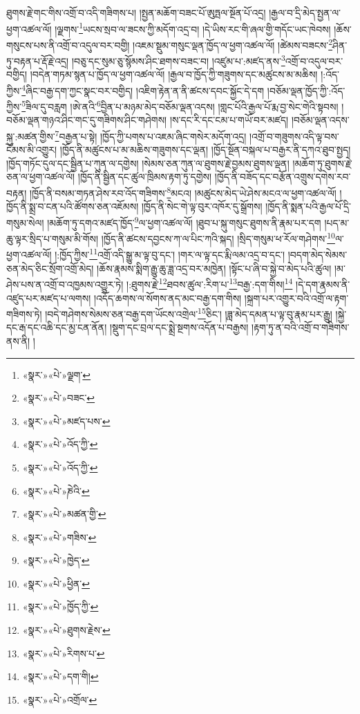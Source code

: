 ཐུགས་རྗེ་གང་གིས་འགྲོ་བ་འདི་གཟིགས་པ། །སྤྱན་མཆོག་བཟང་པོ་ཨུཏྤལ་སྔོན་པོ་འདྲ། །རྒྱལ་བ་དྲི་མེད་སྤྱན་ལ་ཕྱག་འཚལ་ལོ། །ལྗགས་\footnote{«སྣར་»«པེ་»ལྗག་}ཡངས་སྲབ་ལ་ཟངས་ཀྱི་མདོག་འདྲ་བ། །དེ་ཡིས་རང་གི་ཞལ་གྱི་གདོང་ཡང་ཁེབས། །ཆོས་གསུངས་པས་ནི་འགྲོ་བ་འདུལ་བར་བགྱི། །འཇམ་སྡུམ་གསུང་ལྡན་ཁྱོད་ལ་ཕྱག་འཚལ་ལོ། །ཚེམས་བཟངས་\footnote{«སྣར་»«པེ་»བཟང་}ཤིན་ཏུ་བརྟན་པ་རྡོ་རྗེ་འདྲ། །བཅུ་དང་སུམ་ཅུ་སྙོམས་ཤིང་ཐགས་བཟང་བ། །འཛུམ་པ་:མཛད་ནས་\footnote{«སྣར་»«པེ་»མཛད་པས་}འགྲོ་བ་འདུལ་བར་བགྱིད། །བདེན་གཏམ་སྙན་པ་ཁྱོད་ལ་ཕྱག་འཚལ་ལོ། །རྒྱལ་བ་ཁྱོད་ཀྱི་གཟུགས་དང་མཚུངས་མ་མཆིས། །:འོད་ཀྱིས་\footnote{«སྣར་»«པེ་»འོད་ཀྱི་}ཞིང་བརྒྱ་དག་ཀྱང་སྣང་བར་བགྱིད། །འཇིག་རྟེན་ན་ནི་ཚངས་དབང་སྐྱོང་དེ་དག །བཅོམ་ལྡན་ཁྱོད་ཀྱི་:འོད་ཀྱིས་\footnote{«སྣར་»«པེ་»འོད་ཀྱི་}ཟིལ་དུ་བརླག །ཨེ་ནའི་\footnote{«སྣར་»«པེ་»ཎེའི་}བྱིན་པ་མཉམ་མེད་བཅོམ་ལྡན་འདས། །གླང་པོའི་རྒྱལ་པོ་རྨ་བྱ་སེང་གེའི་སྟབས། །བཅོམ་ལྡན་གཉའ་ཤིང་གང་དུ་གཟིགས་ཤིང་གཤེགས། །ས་དང་རི་དང་ངམ་པ་གཡོ་བར་མཛད། །བཅོམ་ལྡན་འདས་སྐུ་:མཚན་གྱིས་\footnote{«སྣར་»«པེ་»མཚན་གྱི་}བརྒྱན་པ་སྟེ། །ཁྱོད་ཀྱི་པགས་པ་འཇམ་ཞིང་གསེར་མདོག་འདྲ། །འགྲོ་བ་གཟུགས་འདི་ལྟ་བས་ངོམས་མི་འགྱུར། །ཁྱོད་ནི་མཚུངས་པ་མ་མཆིས་གཟུགས་དང་ལྡན། །ཁྱོད་སྔོན་བསྐལ་པ་བརྒྱར་ནི་དཀའ་ཐུབ་སྤྱད། །ཁྱོད་གཏོང་དུལ་དང་སྦྱིན་པ་ཀུན་ལ་དགྱེས། །སེམས་ཅན་ཀུན་ལ་ཐུགས་རྗེ་བྱམས་ཐུགས་ལྡན། །མཆོག་ཏུ་ཐུགས་རྗེ་ཅན་ལ་ཕྱག་འཚལ་ལོ། །ཁྱོད་ནི་སྦྱིན་དང་ཚུལ་ཁྲིམས་རྟག་ཏུ་དགྱེས། །ཁྱོད་ནི་བཟོད་དང་བརྩོན་འགྲུས་དགེས་རབ་བརྟན། །ཁྱོད་ནི་བསམ་གཏན་ཤེས་རབ་འོད་གཟིགས་\footnote{«སྣར་»«པེ་»གཟིས་}མངའ། །མཚུངས་མེད་ཡེ་ཤེས་མངའ་ལ་ཕྱག་འཚལ་ལོ། །ཁྱོད་ནི་སྨྲ་བ་ངན་པའི་ཚོགས་ཅན་འཇོམས། །ཁྱོད་ནི་སེང་གེ་ལྟ་བུར་འཁོར་དུ་སྒྲོགས། །ཁྱོད་ནི་སྨན་པའི་རྒྱལ་པོ་དྲི་གསུམ་སེལ། །མཆོག་ཏུ་དགའ་མཛད་ཁྱོད་\footnote{«སྣར་»«པེ་»ཁྱེད་}ལ་ཕྱག་འཚལ་ལོ། །ཐུབ་པ་སྐུ་གསུང་ཐུགས་ནི་རྣམ་པར་དག །པད་མ་ཆུ་ལྟར་སྲིད་པ་གསུམ་མི་གོས། །ཁྱོད་ནི་ཚངས་དབྱངས་ཀ་ལ་པིང་ཀའི་སྐད། །སྲིད་གསུམ་ཕ་རོལ་གཤེགས་\footnote{«སྣར་»«པེ་»ཕྱིན་}ལ་ཕྱག་འཚལ་ལོ། །:ཁྱོད་ཀྱིས་\footnote{«སྣར་»«པེ་»ཁྱོད་ཀྱི་}འགྲོ་འདི་སྒྱུ་མ་ལྟ་བུ་དང་། །གར་ལ་ལྟ་དང་རྨི་ལམ་འདྲ་བ་དང་། །བདག་མེད་སེམས་ཅན་མེད་ཅིང་སྲོག་འགྲོ་མེད། །ཆོས་རྣམས་སྨིག་རྒྱུ་ཆུ་ཟླ་འདྲ་བར་མཁྱེན། །སྟོང་པ་ཞི་བ་སྐྱེ་བ་མེད་པའི་ཚུལ། །མ་ཤེས་པས་ན་འགྲོ་བ་འཁྱམས་འགྱུར་ཏེ། །:ཐུགས་རྗེ་\footnote{«སྣར་»«པེ་»ཐུགས་རྗེས་}ཐབས་ཚུལ་:རིག་པ་\footnote{«སྣར་»«པེ་»རིགས་པ་}བརྒྱ་:དག་གིས།\footnote{«སྣར་»«པེ་»དག་གི།} །དེ་དག་རྣམས་ནི་འཛུད་པར་མཛད་པ་ལགས། །འདོད་ཆགས་ལ་སོགས་ནད་མང་བརྒྱ་དག་གིས། །སྐྲག་པར་འགྱུར་བའི་འགྲོ་ལ་རྟག་གཟིགས་ཏེ། །བདེ་གཤེགས་སེམས་ཅན་བརྒྱ་དག་ཡོངས་འགྲེལ་\footnote{«སྣར་»«པེ་»འགྲོལ་}ཅིང་། །ཟླ་མེད་དམན་པ་ལྟ་བུ་རྣམ་པར་རྒྱུ། །སྐྱེ་དང་རྒ་དང་འཆི་དང་མྱ་ངན་ནོན། །སྡུག་དང་བྲལ་དང་སྨྲེ་སྔགས་འདོན་པ་བརྒྱས། །རྟག་ཏུ་ན་བའི་འགྲོ་བ་གཟིགས་ནས་ནི། །
